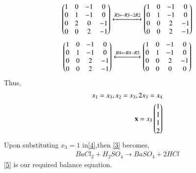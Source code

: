 \documentclass[journal,12pt,twocolumn]{IEEEtran}
\begin{document}
\begin{align}
   \begin{pmatrix}
1 & 0 & -1 & 0\\
0 & 1 & -1 & 0\\
0 & 2 & 0 & -1\\
0 & 0 & 2 & -1\end{pmatrix}\xleftrightarrow[]{R3\leftarrow R3-2R2} \begin{pmatrix}
1 & 0 & -1 & 0\\
0 & 1 & -1 & 0\\
0 & 0 & 2 & -1\\
0 & 0 & 2 & -1\end{pmatrix}
\end{align}
\begin{align}
    \begin{pmatrix}
1 & 0 & -1 & 0\\
0 & 1 & -1 & 0\\
0 & 0 & 2 & -1\\
0 & 0 & 2 & -1\end{pmatrix}\xleftrightarrow[]{R4\leftarrow R4-R3} \begin{pmatrix}
1 & 0 & -1 & 0\\
0 & 1 & -1 & 0\\
0 & 0 & 2 & -1\\
0 & 0 & 0 & 0\end{pmatrix}
\end{align}
Thus,
\begin{align}
    x_1=x_3,x_2=x_3,2x_3=x_4\\
    \mathbf{x}=x_3\begin{pmatrix}1\\1\\1\\2\end{pmatrix}\label{4}
\end{align}
Upon substituting $x_3=1$ in\eqref{4},then \eqref{3} becomes,
\begin{align}\label{5}
    \boxed{BaCl_2 + H_2SO_4 \xrightarrow{} BaSO_4 + 2HCl}
\end{align}
 \eqref{5} is our required balance equation.
\end{document}

